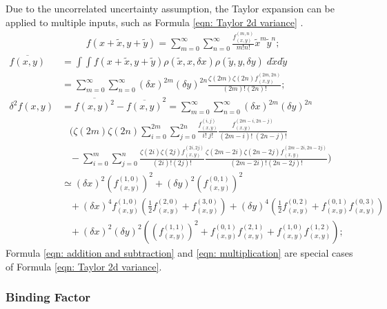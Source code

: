 \documentclass[twoside]{article}
\numberwithin{equation}{section}
\newcommand{\eqspace}{\;\;\;}
\begin{document}
Due to the uncorrelated uncertainty assumption, the Taylor expansion can be applied to multiple inputs, such as Formula \eqref{eqn: Taylor 2d variance} \cite{Prev_Precision_Arithmetic} .
\begin{align}
\label{eqn: Taylor 2d}
&f(x + \tilde{x}, y + \tilde{y}) = \sum_{m=0}^{\infty} \sum_{n=0}^{\infty} \frac{f^{(m,n)}_{(x,y)}}{m! n!} \tilde{x}^m \tilde{y}^n; 
\end{align}
\begin{align}
\label{eqn: Taylor 2d mean}
\overline{f(x,y)} &= \int \int f(x + \tilde{x}, y + \tilde{y}) \rho(\tilde{x}, x, \delta x) \rho(\tilde{y}, y, \delta y)\; d \tilde{x} d \tilde{y} \nonumber \\
&= \sum_{m=0}^{\infty} \sum_{n=0}^{\infty} (\delta x)^{2m} (\delta y)^{2n}  \frac{\zeta(2m) \zeta(2n) f^{(2m,2n)}_{(x,y)}}{(2m)! (2n)!}; \\
\label{eqn: Taylor 2d variance}
\delta^2 f(x, y) &= \overline{f(x, y)^2} - \overline{f(x, y)}^2 = \sum_{m=0}^{\infty} \sum_{n=0}^{\infty} (\delta x)^{2m} (\delta y)^{2n} \nonumber \\
&\eqspace (\zeta(2m) \zeta(2n) \sum_{i=0}^{2m} \sum_{j=0}^{2n} \frac{f^{(i,j)}_{(x,y)}}{i!\;j!}\frac{f^{(2m-i,2n-j)}_{(x,y)}}{(2m-i)!\;(2n-j)!} \nonumber \\
&\eqspace - \sum_{i=0}^{m} \sum_{j=0}^{n} \frac{\zeta(2i) \zeta(2j) f^{(2i,2j)}_{(x,y)}}{(2i)!(2j)!}\frac{\zeta(2m-2i) \zeta(2n-2j) f^{(2m-2i,2n-2j)}_{(x,y)}}{(2m-2i)!(2n-2j)!}) \\
&\simeq (\delta x)^2 (f^{(1,0)}_{(x,y)})^2 + (\delta y)^2 (f^{(0,1)}_{(x,y)})^2  \nonumber \\
&\eqspace + (\delta x)^4 f^{(1,0)}_{(x,y)} (\frac{1}{2} f^{(2,0)}_{(x,y)} + f^{(3,0)}_{(x,y)})
      + (\delta y)^4 (\frac{1}{2} f^{(0,2)}_{(x,y)} + f^{(0,1)}_{(x,y)} f^{(0,3)}_{(x,y)}) \nonumber \\
&\eqspace + (\delta x)^2 (\delta y)^2 ((f^{(1,1)}_{(x,y)})^2 + f^{(0,1)}_{(x,y)} f^{(2,1)}_{(x,y)} + f^{(1,0)}_{(x,y)} f^{(1,2)}_{(x,y)});
\end{align}
Formula \eqref{eqn: addition and subtraction} and \eqref{eqn: multiplication} are special cases of Formula \eqref{eqn: Taylor 2d variance}.


\subsubsection{Binding Factor}
\end{document}
